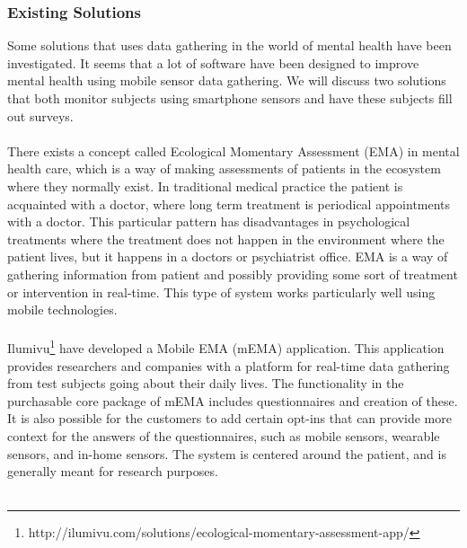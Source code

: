 \subsubsection{Existing Solutions}

Some solutions that uses data gathering in the world of mental health have been investigated. It seems that a lot of software have been designed to improve mental health using mobile sensor data gathering. We will discuss two solutions that both monitor subjects using smartphone sensors and have these subjects fill out surveys. 
\\\\
There exists a concept called Ecological Momentary Assessment (EMA) \parencite{shiffman2008ecological} in mental health care, which is a way of making assessments of patients in the ecosystem where they normally exist. In traditional medical practice the patient is acquainted with a doctor, where long term treatment is periodical appointments with a doctor. This particular pattern has disadvantages in psychological treatments where the treatment does not happen in the environment where the patient lives, but it happens in a doctors or psychiatrist office. EMA is a way of gathering information from patient and possibly providing some sort of treatment or intervention in real-time. This type of system works particularly well using mobile technologies.
\\\\
Ilumivu\footnote{http://ilumivu.com/solutions/ecological-momentary-assessment-app/} have developed a Mobile EMA (mEMA) application. This application provides researchers and companies with a platform for real-time data gathering from test subjects going about their daily lives. The functionality in the purchasable core package of mEMA includes questionnaires and creation of these. It is also possible for the customers to add certain opt-ins that can provide more context for the answers of the questionnaires, such as mobile sensors, wearable sensors, and in-home sensors. The system is centered around the patient, and is generally meant for research purposes.
\\\\
